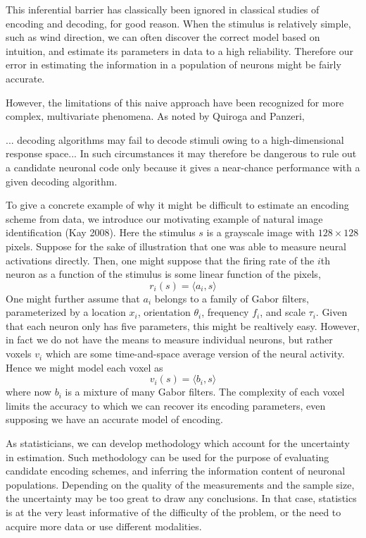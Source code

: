 \documentclass[12pt]{article}
\begin{document}
This inferential barrier has classically been ignored in classical
studies of encoding and decoding, for good reason.  When the stimulus
is relatively simple, such as wind direction, we can often discover
the correct model based on intuition, and estimate its parameters in
data to a high reliability.  Therefore our error in estimating the
information in a population of neurons might be fairly accurate.

However, the limitations of this naive approach have been recognized
for more complex, multivariate phenomena.  As noted by Quiroga and
Panzeri, 
\begin{displayquote}
... decoding algorithms may fail to decode stimuli owing to a
high-dimensional response space... In such circumstances it may
therefore be dangerous to rule out a candidate neuronal code only
because it gives a near-chance performance with a given decoding
algorithm.
\end{displayquote}

To give a concrete example of why it might be difficult to estimate an
encoding scheme from data, we introduce our motivating example of
natural image identification (Kay 2008).  Here the stimulus $s$ is a
grayscale image with $128 \times 128$ pixels. Suppose for the sake of
illustration that one was able to measure neural activations directly.
Then, one might suppose that the firing rate of the $i$th neuron as a
function of the stimulus is some linear function of the pixels,
\[
r_i(s) = \langle a_i,  s \rangle
\]
One might further assume that $a_i$ belongs to a family of Gabor
filters, parameterized by a location $x_i$, orientation $\theta_i$,
frequency $f_i$, and scale $\tau_i$.  Given that each neuron only has
five parameters, this might be realtively easy.  However, in fact we
do not have the means to measure individual neurons, but rather voxels
$v_i$ which are some time-and-space average version of the neural
activity.  Hence we might model each voxel as
\[
v_i(s) = \langle b_i,  s \rangle
\]
where now $b_i$ is a mixture of many Gabor filters.  The complexity of
each voxel limits the accuracy to which we can recover its encoding
parameters, even supposing we have an accurate model of encoding.

As statisticians, we can develop methodology which account for the
uncertainty in estimation.  Such methodology can be used for the
purpose of evaluating candidate encoding schemes, and inferring the
information content of neuronal populations.  Depending on the quality
of the measurements and the sample size, the uncertainty may be too
great to draw any conclusions.  In that case, statistics is at the
very least informative of the difficulty of the problem, or the need
to acquire more data or use different modalities.
\end{document}
